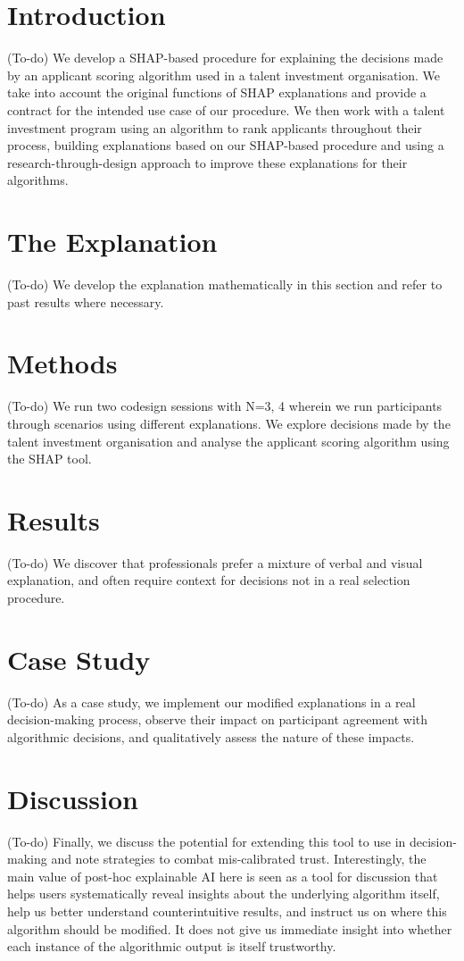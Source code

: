 \minitoc

\section{Introduction}
(To-do) We develop a SHAP-based procedure for explaining the decisions made by an applicant scoring algorithm used in a talent investment organisation. We take into account the original functions of SHAP explanations and provide a contract for the intended use case of our procedure. We then work with a talent investment program using an algorithm to rank applicants throughout their process, building explanations based on our SHAP-based procedure and using a research-through-design approach to improve these explanations for their algorithms.

\section{The Explanation}
(To-do) We develop the explanation mathematically in this section and refer to past results where necessary.

\section{Methods}
(To-do) We run two codesign sessions with N=3, 4 wherein we run participants through scenarios using different explanations. We explore decisions made by the talent investment organisation and analyse the applicant scoring algorithm using the SHAP tool.

\section{Results}
(To-do) We discover that professionals prefer a mixture of verbal and visual explanation, and often require context for decisions not in a real selection procedure. 

\section{Case Study}
(To-do) As a case study, we implement our modified explanations in a real decision-making process, observe their impact on participant agreement with algorithmic decisions, and qualitatively assess the nature of these impacts.

\section{Discussion}
(To-do) Finally, we discuss the potential for extending this tool to use in decision-making and note strategies to combat mis-calibrated trust. Interestingly, the main value of post-hoc explainable AI here is seen as a tool for discussion that helps users systematically reveal insights about the underlying algorithm itself, help us better understand counterintuitive results, and instruct us on where this algorithm should be modified. It does not give us immediate insight into whether each instance of the algorithmic output is itself trustworthy.


